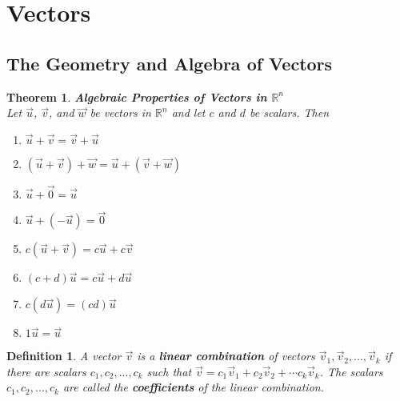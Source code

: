 \documentclass{article}
\theoremstyle{sltheorem}
\newtheorem{definition}{Definition}[section]
\newtheorem{theorem}{Theorem}[section]
\begin{document}
\section{Vectors}
\subsection{The Geometry and Algebra of Vectors}
\begin{theorem}
    \textbf{Algebraic Properties of Vectors in $\mathbb{R}^n$}\\
    Let $\vec u$, $\vec v$, and $\vec w$ be vectors in $\mathbb{R}^n$ and let $c$ and $d$ be scalars. Then
    \begin{enumerate}
        \item $\vec u + \vec v = \vec v + \vec u$
        \item $(\vec u + \vec v) + \vec w = \vec u + (\vec v + \vec w)$
        \item $\vec u + \vec 0 = \vec u$
        \item $\vec u + (- \vec u) = \vec 0$
        \item $c(\vec u + \vec v) = c\vec u + c\vec v$
        \item $(c+d)\vec u = c\vec u + d\vec u$
        \item $c(d\vec u) = (cd)\vec u$
        \item $1\vec u = \vec u$
    \end{enumerate}
\end{theorem}
\begin{definition}
    A vector $\vec v$ is a \textbf{linear combination} of vectors $\vec v_1, \vec v_2, ...,\vec v_k$ if there are scalars $c_1, c_2, ..., c_k$ such that $\vec v = c_1 \vec v_1 + c_2 \vec v_2 + \cdots c_k\vec v_k$. The scalars $c_1, c_2, ..., c_k$ are called the \textbf{coefficients} of the linear combination.
\end{definition}
\end{document}
